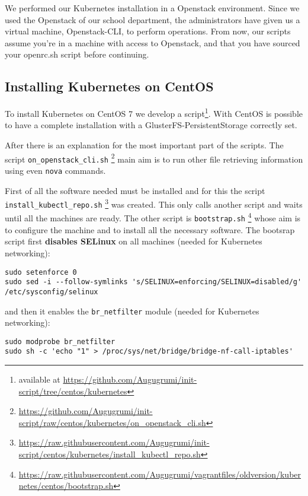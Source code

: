 We performed our Kubernetes installation in a Openstack environment.
Since we used the Openstack of our school department, the administrators have 
given us a virtual machine, Openstack-CLI, to perform operations. From now, our 
scripts assume you're in a machine with access to Openstack, and that you have 
sourced your openrc.sh script before continuing.

\subsection{Installing Kubernetes on CentOS}
\label{installing-kubernetes-on-centos}

To install Kubernetes on CentOS 7 we develop a script\footnote{available
at \url{https://github.com/Augugrumi/init-script/tree/centos/kubernetes}}.
With CentOS is possible to have a complete installation with
a GlusterFS-PersistentStorage correctly set.

After there is an explanation for the most important part of the scripts. The 
script \verb!on_openstack_cli.sh!
\footnote{\url{https://github.com/Augugrumi/init-script/raw/centos/kubernetes/on_openstack_cli.sh}}
main aim is to run other file retrieving information using even \texttt{nova} 
commands.

First of all the software needed must be installed and for this the script 
\\\verb!install_kubectl_repo.sh!
\footnote{\url{https://raw.githubusercontent.com/Augugrumi/init-script/centos/kubernetes/install_kubectl_repo.sh}}
was created. This only calls another script and waits until all the machines
are ready. The other script is \verb!bootstrap.sh!
\footnote{\url{https://raw.githubusercontent.com/Augugrumi/vagrantfiles/oldversion/kubernetes/centos/bootstrap.sh}}
whose aim is to configure the machine and to install all the necessary
software. The bootsrap script first \textbf{disables SELinux} on all machines 
(needed for Kubernetes networking):
\begin{lstlisting}
sudo setenforce 0
sudo sed -i --follow-symlinks 's/SELINUX=enforcing/SELINUX=disabled/g' /etc/sysconfig/selinux
\end{lstlisting}

and then it enables the \verb!br_netfilter! module (needed for Kubernetes
networking):
\begin{lstlisting}
sudo modprobe br_netfilter
sudo sh -c 'echo "1" > /proc/sys/net/bridge/bridge-nf-call-iptables'
\end{lstlisting}

